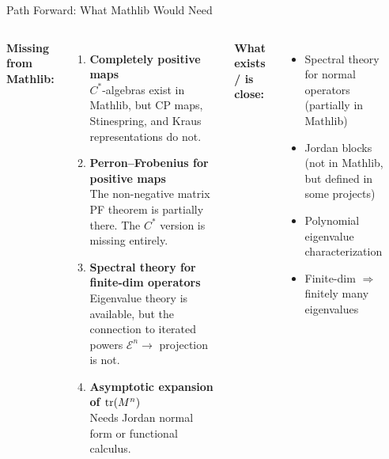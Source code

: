 \documentclass[aspectratio=169,10pt]{beamer}
\begin{document}
\begin{frame}{Path Forward: What Mathlib Would Need}
\vspace{-0.3em}
\begin{columns}[T]
{\small\textbf{\textcolor{softred}{Missing from Mathlib:}}}
\begin{enumerate}\itemsep0.15em
  \item {\small\textbf{Completely positive maps}\\
  {\scriptsize $C^*$-algebras exist in Mathlib, but CP maps, Stinespring, and Kraus representations do not.}}
  \item {\small\textbf{Perron--Frobenius for positive maps}\\
  {\scriptsize The non-negative matrix PF theorem is partially there. The $C^*$ version is missing entirely.}}
  \item {\small\textbf{Spectral theory for finite-dim operators}\\
  {\scriptsize Eigenvalue theory is available, but the connection to iterated powers $\mathcal{E}^n \to$ projection is not.}}
  \item {\small\textbf{Asymptotic expansion of $\mathrm{tr}(M^n)$}\\
  {\scriptsize Needs Jordan normal form or functional calculus.}}
\end{enumerate}

{\small\textbf{\textcolor{leangreen}{What exists / is close:}}}
\begin{itemize}\itemsep0.15em
  \item {\small Spectral theory for normal operators (partially in Mathlib)}
  \item {\small Jordan blocks (not in Mathlib, but defined in some projects)}
  \item {\small Polynomial eigenvalue characterization}
  \item {\small Finite-dim $\Rightarrow$ finitely many eigenvalues}
\end{itemize}

\vspace{0.5em}
\begin{center}
\end{center}
\end{columns}
\end{frame}
\end{document}
